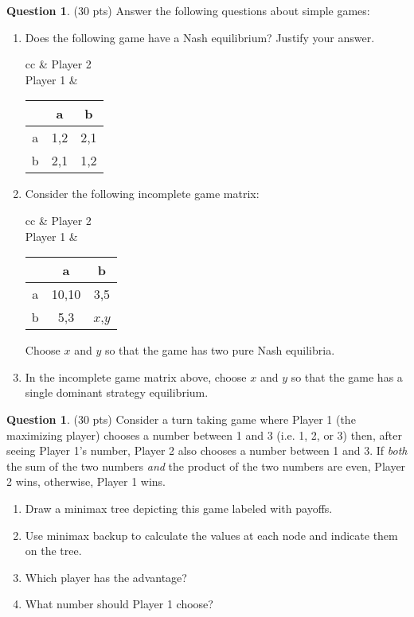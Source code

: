 \documentclass{article}
\theoremstyle{definition}
\newtheorem{question}[thm]{Question}
\begin{document}
\clearpage
\begin{question} (30 pts)
    Answer the following questions about simple games:
    \begin{enumerate}[label=\alph*)]
        \item Does the following game have a Nash equilibrium? Justify your answer.
            \begin{center}
                \begin{tabular}{cc}
                & Player 2\\
                    Player 1 & 
            \begin{tabular}{c|c|c|}
            & a & b \\ \hline
            a & 1,2 & 2,1 \\ \hline
            b & 2,1 & 1,2 \\ \hline
            \end{tabular}
                \end{tabular}
            \end{center}
        \item Consider the following incomplete game matrix:
            \begin{center}
                \begin{tabular}{cc}
                & Player 2\\
                    Player 1 & 
            \begin{tabular}{c|c|c|}
            & a & b \\ \hline
            a & 10,10 & 3,5 \\ \hline
            b & 5,3 & $x$,$y$ \\ \hline
            \end{tabular}
                \end{tabular}
            \end{center}
            Choose $x$ and $y$ so that the game has two pure Nash equilibria.
        \item In the incomplete game matrix above, choose $x$ and $y$ so that the game has a single dominant strategy equilibrium.
    \end{enumerate}
\end{question}

\begin{question} (30 pts)
    Consider a turn taking game where Player 1 (the maximizing player) chooses a number between 1 and 3 (i.e. 1, 2, or 3) then, after seeing Player 1's number, Player 2 also chooses a number between 1 and 3. If \emph{both} the sum of the two numbers \emph{and} the product of the two numbers are even, Player 2 wins, otherwise, Player 1 wins.
    \begin{enumerate}[label=\alph*)]
        \item Draw a minimax tree depicting this game labeled with payoffs.
        \item Use minimax backup to calculate the values at each node and indicate them on the tree.
        \item Which player has the advantage?
        \item What number should Player 1 choose?
    \end{enumerate}
\end{question}
\end{document}
